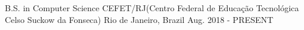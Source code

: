 

\begin{cventries}

  \cventry
    {B.S. in Computer Science} %
    {CEFET/RJ(Centro Federal de Educação Tecnológica Celso Suckow da Fonseca)} %
    {Rio de Janeiro, Brazil} %
    {Aug. 2018 - PRESENT} %
    {}
\end{cventries}
